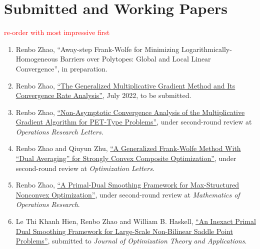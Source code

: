 \documentclass[11pt]{article}
\newcommand{\MOR}{Mathematics of Operations Research}
\newcommand{\JOTA}{Journal of Optimization Theory and Applications}
\newcommand{\ORL}{Operations Research Letters}
\newcommand{\OPTL}{Optimization Letters}
\begin{document}


\section*{\large Submitted and Working Papers}\textcolor{red}{re-order with most impressive first}

\begin{enumerate}[label=W\arabic*.]\setlength{\leftskip}{2ex}
\item Renbo Zhao, ``Away-step Frank-Wolfe for Minimizing Logarithmically-Homogeneous Barriers over Polytopes: Global and Local Linear Convergence'', in preparation. 
\item Renbo Zhao, \href{https://arxiv.org/abs/2207.13198}{``The Generalized Multiplicative Gradient Method and Its Convergence Rate Analysis''}, July 2022, to be submitted.
\item Renbo Zhao, \href{https://arxiv.org/abs/2109.05601}{``Non-Asymptotic Convergence Analysis of the Multiplicative Gradient Algorithm for PET-Type Problems''}, under second-round review at {\em \ORL}.
\item Renbo Zhao and Qiuyun Zhu, \href{https://arxiv.org/abs/2106.15786}{``A Generalized Frank-Wolfe Method With “Dual Averaging” for Strongly Convex Composite Optimization''}, under second-round review at {\em \OPTL}.
\item Renbo Zhao, \href{https://arxiv.org/abs/2003.04375}{``A Primal-Dual Smoothing Framework for Max-Structured Nonconvex Optimization''}, under second-round review at {\em \MOR}. 
\item Le Thi Khanh Hien, {Renbo Zhao} and William B. Haskell, \href{https://arxiv.org/abs/1711.03669}{``An Inexact Primal Dual Smoothing Framework for Large-Scale Non-Bilinear Saddle Point Problems''}, submitted to {\em \JOTA}.
\end{enumerate}


\end{document}
